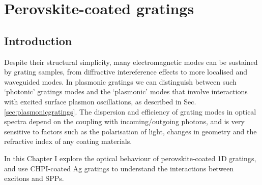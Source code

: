 
\chapter{Perovskite-coated gratings}

\graphicspath{{Chapter7/Figures/}}

\section{Introduction}
Despite their structural simplicity, many electromagnetic modes can be sustained by grating samples, from diffractive intereference effects to more localised and waveguided modes. In plasmonic gratings we can distinguish between such `photonic' gratings modes and the `plasmonic' modes that involve interactions with excited surface plasmon oscillations, as described in Sec.\,\ref{sec:plasmonicgratings}. The dispersion and efficiency of grating modes in optical spectra depend on the coupling with incoming/outgoing photons, and is very sensitive to factors such as the polarisation of light, changes in geometry and the refractive index of any coating materials.

In this Chapter I explore the optical behaviour of perovskite-coated 1D gratings, and use CHPI-coated Ag gratings to understand the interactions between excitons and SPPs.

